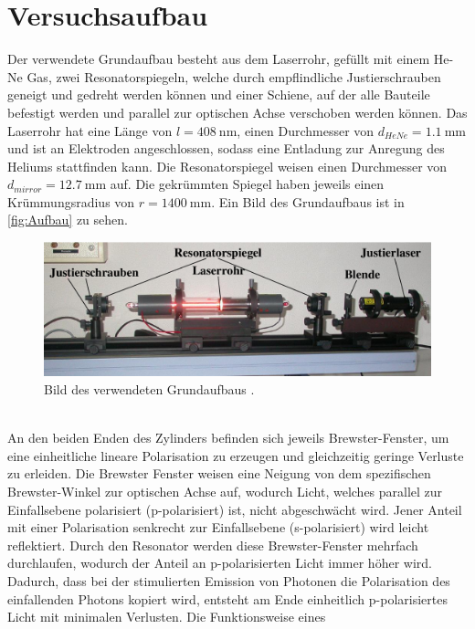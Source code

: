 \chapter{Versuchsaufbau}
\label{cha:Versuchsaufbau}

Der verwendete Grundaufbau besteht aus dem Laserrohr, gefüllt mit einem He-Ne Gas, zwei Resonatorspiegeln, welche durch empflindliche Justierschrauben geneigt und gedreht werden können und 
einer Schiene, auf der alle Bauteile befestigt werden und parallel zur optischen Achse verschoben werden können. Das Laserrohr hat eine Länge von $l=\qty{408}{\nano\metre}$, einen Durchmesser
von $d_{HeNe} = \qty{1.1}{\milli\metre}$ und ist an Elektroden angeschlossen, sodass eine Entladung zur Anregung des Heliums stattfinden kann. Die Resonatorspiegel weisen einen Durchmesser von $d_{mirror} = \qty{12.7}{\milli\metre}$
auf. Die gekrümmten Spiegel haben jeweils einen Krümmungsradius von $r = \qty{1400}{\milli\metre}$.
Ein Bild des Grundaufbaus ist in \autoref{fig:Aufbau} zu sehen.
\begin{figure}
    \centering
    \includegraphics[width = \textwidth]{v61_bilder/Aufbau.png}
    \caption{Bild des verwendeten Grundaufbaus \cite{v61}.}
    \label{fig:Aufbau}
\end{figure}
\\An den beiden Enden des Zylinders befinden sich jeweils Brewster-Fenster, um eine einheitliche lineare Polarisation zu erzeugen und gleichzeitig geringe Verluste zu erleiden. Die Brewster Fenster
weisen eine Neigung von dem spezifischen Brewster-Winkel zur optischen Achse auf, wodurch Licht, welches parallel zur Einfallsebene polarisiert (p-polarisiert) ist, nicht abgeschwächt wird. Jener Anteil mit einer Polarisation
senkrecht zur Einfallsebene (s-polarisiert) wird leicht reflektiert. Durch den Resonator werden diese Brewster-Fenster mehrfach durchlaufen, wodurch der Anteil an p-polarisierten Licht immer höher wird.
Dadurch, dass bei der stimulierten Emission von Photonen die Polarisation des einfallenden Photons kopiert wird, entsteht am Ende einheitlich p-polarisiertes Licht mit minimalen Verlusten. Die Funktionsweise eines
